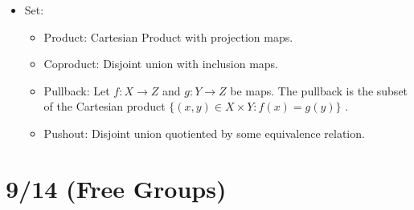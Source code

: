 \documentclass[11pt, oneside]{amsart}   	%
\theoremstyle{definition}
\begin{document}
\begin{itemize}
\begin{itemize}
\begin{itemize}
				\end{itemize}
			
			\item Set:
			
				\begin{itemize}
				
					\item Product: Cartesian Product with projection maps.
					
					\item Coproduct: Disjoint union with inclusion maps.
					
					\item Pullback: Let $f: X\rightarrow Z$ and $g: Y\rightarrow Z$ be maps. The pullback is the subset of the Cartesian product 
					$\{(x, y)\in X\times Y : f(x) = g(y)\}$ .
					
					\item Pushout: Disjoint union quotiented by some equivalence relation.
				
				\end{itemize}
		
		\end{itemize}

\end{itemize}

\section{9/14 (Free Groups)}
\end{document}
